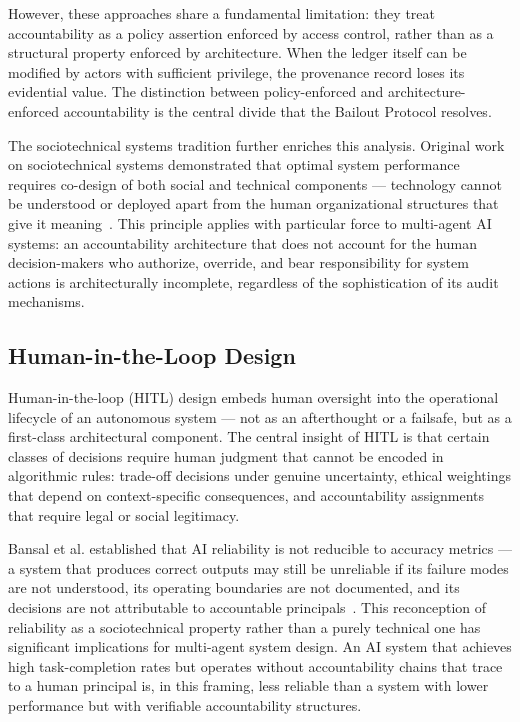 However, these approaches share a fundamental limitation: they treat accountability as a policy assertion enforced by access control, rather than as a structural property enforced by architecture. When the ledger itself can be modified by actors with sufficient privilege, the provenance record loses its evidential value. The distinction between policy-enforced and architecture-enforced accountability is the central divide that the Bailout Protocol resolves.

The sociotechnical systems tradition further enriches this analysis. Original work on sociotechnical systems demonstrated that optimal system performance requires co-design of both social and technical components — technology cannot be understood or deployed apart from the human organizational structures that give it meaning~\cite{tristr81}. This principle applies with particular force to multi-agent AI systems: an accountability architecture that does not account for the human decision-makers who authorize, override, and bear responsibility for system actions is architecturally incomplete, regardless of the sophistication of its audit mechanisms.

\subsection{Human-in-the-Loop Design}

Human-in-the-loop (HITL) design embeds human oversight into the operational lifecycle of an autonomous system — not as an afterthought or a failsafe, but as a first-class architectural component. The central insight of HITL is that certain classes of decisions require human judgment that cannot be encoded in algorithmic rules: trade-off decisions under genuine uncertainty, ethical weightings that depend on context-specific consequences, and accountability assignments that require legal or social legitimacy.

Bansal et al. established that AI reliability is not reducible to accuracy metrics — a system that produces correct outputs may still be unreliable if its failure modes are not understood, its operating boundaries are not documented, and its decisions are not attributable to accountable principals~\cite{bansal2019}. This reconception of reliability as a sociotechnical property rather than a purely technical one has significant implications for multi-agent system design. An AI system that achieves high task-completion rates but operates without accountability chains that trace to a human principal is, in this framing, less reliable than a system with lower performance but with verifiable accountability structures.

